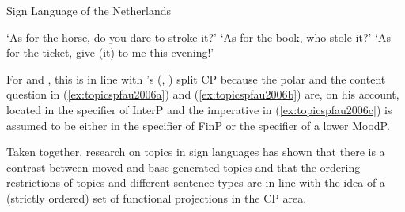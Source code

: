 \begin{exe}
\ex Sign Language of the Netherlands\label{topicspfau2006}
\begin{xlist}
\ex {} 
\glt `As for the horse, do you dare to stroke it?' \label{ex:topicspfau2006a}
\ex {} 
%
\glt `As for the book, who stole it?' \label{ex:topicspfau2006b}
\ex {} 
%
\glt `As for the ticket, give (it) to me this evening!' \label{ex:topicspfau2006c}
\end{xlist}
\end{exe}

\noindent For \citet{pfau2008topics} and \citet{aboh2010sa}, this is in line with \citeauthor{rizzi1997fine}'s (\citeyear{rizzi1997fine}, \citeyear{rizzi2001position}) split CP because the polar and the content question in (\ref{ex:topicspfau2006a}) and (\ref{ex:topicspfau2006b}) are, on his account, located in the specifier of InterP and the imperative in (\ref{ex:topicspfau2006c}) is assumed to be either in the specifier of FinP or the specifier of a lower MoodP.

Taken together, research on topics in sign languages has shown that there is a contrast between moved and base-generated topics and that the ordering restrictions of topics and different sentence types are in line with the idea of a (strictly ordered) set of functional projections in the CP area.

